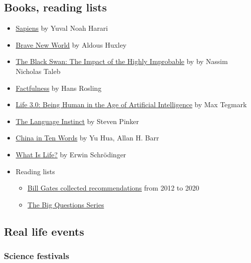 \documentclass{article}
\begin{document}
\subsection{Books, reading lists}


\begin{itemize}
    \item \href{https://www.goodreads.com/book/show/23692271-sapiens}{Sapiens} by Yuval Noah Harari
    \item \href{https://www.goodreads.com/book/show/5129.Brave_New_World}{Brave New World} by Aldous Huxley
    \item \href{https://www.goodreads.com/book/show/242472.The_Black_Swan}{The Black Swan: The Impact of the Highly Improbable} by by Nassim Nicholas Taleb 
    \item \href{https://www.goodreads.com/book/show/34890015-factfulness}{Factfulness} by Hans Rosling
    \item \href{https://www.goodreads.com/book/show/34272565-life-3-0}{Life 3.0: Being Human in the Age of Artificial Intelligence} by Max Tegmark
    \item \href{https://www.goodreads.com/en/book/show/5755}{The Language Instinct} by Steven Pinker
    \item \href{https://www.goodreads.com/book/show/12884314-china-in-ten-words}{China in Ten Words} by Yu Hua, Allan H. Barr
    \item \href{https://www.goodreads.com/book/show/162780.What_Is_Life_with_Mind_and_Matter_and_Autobiographical_Sketches}{What Is Life?} by Erwin Schrödinger
    \item Reading lists
    \begin{itemize}
        \item \href{https://bookriot.com/bill-gates-book-recommendations/}{Bill Gates collected recommendations} from 2012 to 2020
        \item \href{https://www.goodreads.com/series/152497}{The Big Questions Series}
    \end{itemize}
\end{itemize}

\subsection{Real life events}

\subsubsection{Science festivals}
\end{document}
